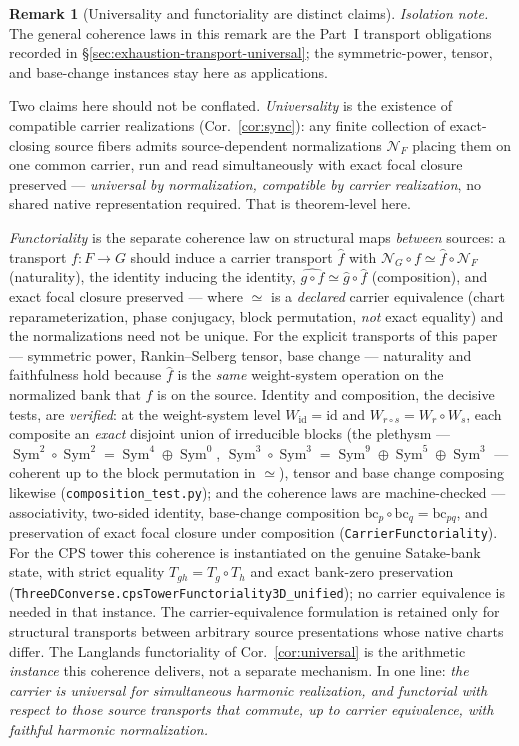 \documentclass[11pt]{article}
\theoremstyle{definition}
\newtheorem{remark}[theorem]{Remark}
\newcommand{\Sym}{\operatorname{Sym}}
\begin{document}
\begin{remark}[Universality and functoriality are distinct claims]\label{rem:functor}
\noindent\emph{Isolation note.} The general coherence laws in this remark are
the Part~I transport obligations recorded in
\S\ref{sec:exhaustion-transport-universal}; the symmetric-power, tensor, and
base-change instances stay here as applications.

Two claims here should not be conflated. \emph{Universality} is the existence of compatible carrier realizations
(Cor.~\ref{cor:sync}): any finite collection of exact-closing source fibers admits source-dependent
normalizations $\mathcal N_F$ placing them on one common carrier, run and read simultaneously with exact focal
closure preserved --- \emph{universal by normalization, compatible by carrier realization}, no shared native
representation required. That is theorem-level here.

\emph{Functoriality} is the separate coherence law on structural maps \emph{between} sources: a transport
$f\colon F\to G$ should induce a carrier transport $\widehat f$ with $\mathcal N_G\circ f\simeq\widehat f\circ
\mathcal N_F$ (naturality), the identity inducing the identity, $\widehat{g\circ f}\simeq\widehat g\circ\widehat
f$ (composition), and exact focal closure preserved --- where $\simeq$ is a \emph{declared} carrier equivalence
(chart reparameterization, phase conjugacy, block permutation, \emph{not} exact equality) and the normalizations
need not be unique. For the explicit transports of this paper --- symmetric power, Rankin--Selberg tensor, base
change --- naturality and faithfulness hold because $\widehat f$ is the \emph{same} weight-system operation on the
normalized bank that $f$ is on the source. Identity and composition, the decisive tests, are \emph{verified}: at
the weight-system level $W_{\mathrm{id}}=\mathrm{id}$ and $W_{r\circ s}=W_r\circ W_s$, each composite an
\emph{exact} disjoint union of irreducible blocks (the plethysm --- $\Sym^2\!\circ\Sym^2=\Sym^4\oplus\Sym^0$,
$\Sym^3\!\circ\Sym^3=\Sym^9\oplus\Sym^5\oplus\Sym^3$ --- coherent up to the block permutation in $\simeq$), tensor
and base change composing likewise (\texttt{composition\_test.py}); and the coherence laws are machine-checked ---
associativity, two-sided identity, base-change composition $\mathrm{bc}_p\circ\mathrm{bc}_q=\mathrm{bc}_{pq}$, and
preservation of exact focal closure under composition (\texttt{CarrierFunctoriality}).  For the CPS
tower this coherence is instantiated on the genuine Satake-bank state, with strict equality
$T_{gh}=T_g\circ T_h$ and exact bank-zero preservation
(\texttt{ThreeDConverse.cpsTowerFunctoriality3D\_unified}); no carrier equivalence is needed in that
instance.  The carrier-equivalence formulation is retained only for structural transports between
arbitrary source presentations whose native charts differ. The Langlands functoriality of
Cor.~\ref{cor:universal} is the arithmetic \emph{instance} this coherence delivers, not a separate mechanism. In
one line: \emph{the carrier is universal for simultaneous harmonic realization, and functorial with respect to
those source transports that commute, up to carrier equivalence, with faithful harmonic normalization.}
\end{remark}
\end{document}
